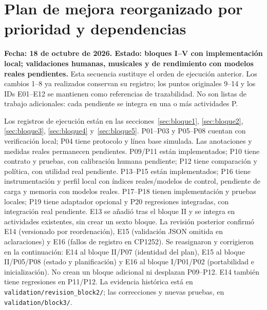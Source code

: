 \section{Plan de mejora reorganizado por prioridad y dependencias}
\label{sec:plan}
\textbf{Fecha: 18 de octubre de 2026. Estado: bloques I--V con implementación local; validaciones humanas, musicales y de rendimiento con modelos reales pendientes.}
Esta secuencia sustituye el orden de ejecución anterior. Los cambios 1--8 ya
realizados conservan su registro; los puntos originales 9--14 y los IDs
E01--E12 se mantienen como referencias de trazabilidad. No son listas de
trabajo adicionales: cada pendiente se integra en una o más actividades P.

Los registros de ejecución están en las secciones~\ref{sec:bloque1},
\ref{sec:bloque2}, \ref{sec:bloque3}, \ref{sec:bloque4} y~\ref{sec:bloque5}.
P01--P03 y P05--P08 cuentan con verificación local; P04 tiene protocolo y línea
base simulada. Las anotaciones y medidas reales permanecen pendientes.
P09/P11 están implementados; P10 tiene contrato y pruebas, con calibración
humana pendiente; P12 tiene comparación y política, con utilidad real pendiente.
P13--P15 están implementados; P16 tiene instrumentación y perfil local con
índices reales/modelos de control, pendiente de carga y memoria con modelos
reales. P17--P18 tienen implementación y pruebas locales; P19 tiene adaptador
opcional y P20 regresiones integradas, con integración real pendiente.
E13 se añadió tras el bloque II y se
integra en actividades existentes, sin crear un sexto bloque.
La revisión posterior confirmó E14 (versionado por reordenación), E15
(validación JSON omitida en aclaraciones) y E16 (fallos de registro en CP1252).
Se reasignaron y corrigieron en la continuación: E14 al bloque II/P07
(identidad del plan), E15 al bloque II/P05/P08 (estado y planificación) y
E16 al bloque I/P01/P02 (portabilidad e inicialización). No crean un bloque
adicional ni desplazan P09--P12. E14 también tiene regresiones en P11/P12.
La evidencia histórica está en \texttt{validation/revision\_block2/}; las
correcciones y nuevas pruebas, en \texttt{validation/block3/}.

